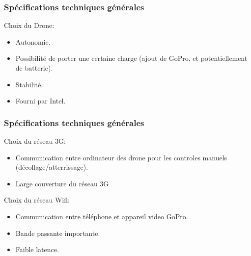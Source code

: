 \documentclass[transparent]{beamer}
\begin{document}
\begin{frame}
	\frametitle{Spécifications techniques générales}
	\begin{block}{Choix du Drone:}
			\begin{itemize}
				\item Autonomie.
				\item Possibilité de porter une certaine charge (ajout de GoPro, et potentiellement de batterie).
				\item Stabilité.
				\item Fourni par Intel.
			\end{itemize}
	\end{block}
\end{frame}

\begin{frame}
\frametitle{Spécifications techniques générales}
	\begin{block}{Choix du réseau 3G:}
			\begin{itemize}
				\item Communication entre ordinateur des drone pour les controles manuels (décollage/atterrissage).
				\item Large couverture du réseau 3G
			\end{itemize}
	\end{block}
	\begin{block}{Choix du réseau Wifi:}
			\begin{itemize}
				\item Communication entre téléphone et appareil video GoPro.
				\item Bande passante importante.
				\item Faible latence.
			\end{itemize}
	\end{block}
\end{frame}
\end{document}
